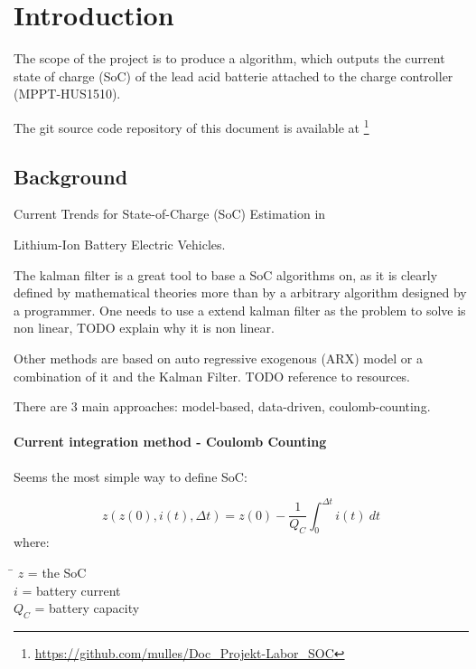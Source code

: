 

\chapter{Introduction}

The scope of the project is to produce a algorithm, which outputs the current state of charge (SoC) of the lead acid batterie attached to the charge controller (MPPT-HUS1510). 

The git source code repository of this document  \cite{Schons_Development_and_validation_2021} is available at \footnote{ \url{https://github.com/mulles/Doc_Projekt-Labor_SOC} }

\section{Background}

\cite{espedal2021current}  Current Trends for State-of-Charge (SoC) Estimation in

Lithium-Ion Battery Electric Vehicles.

The kalman filter is a great tool to base a SoC algorithms on, as it is clearly defined by mathematical theories more than by a arbitrary algorithm designed by a programmer. One needs to use a extend kalman filter as the problem to solve is non linear, TODO explain why it is non linear. 

Other methods are based on auto regressive exogenous (ARX) model or a combination of it and the Kalman Filter. TODO reference to resources.

There are 3 main approaches: model-based, data-driven, coulomb-counting. 

\subsubsection{Current integration method - Coulomb Counting}

Seems the most simple way to define SoC:

\begin{equation}
z( {z(0)},{{i}}(t),\Delta{t}) = z(0) - \frac{1}{{Q_{C}}}\int_{0}^{\Delta t} {i(t)\ dt}
\end{equation}
where: 
\begin{tabbing}
\phantom{$v(t)  \  \ \ \ $}\= \kill
$z  $\> = the SoC  \\
$i  $\> = battery current  \\
$Q_{C}$\> =  battery capacity   \\
\end{tabbing}

